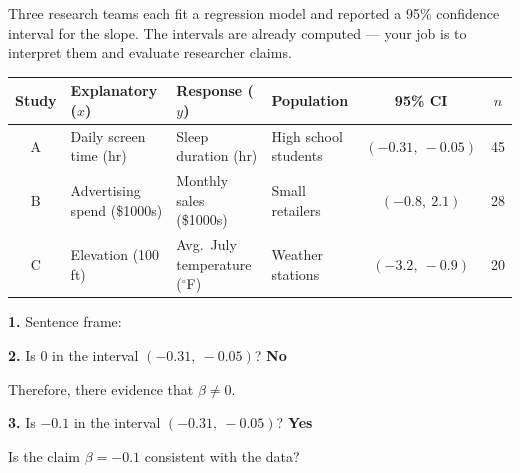 \documentclass[10pt]{article}
\begin{document}
\namepartnerperiod

\vspace{0.1in}
Three research teams each fit a regression model and reported a 95\% confidence interval
for the slope. The intervals are already computed --- your job is to interpret them and
evaluate researcher claims.

\vspace{0.08in}
\begin{center}
\renewcommand{\arraystretch}{1.4}
\begin{tabular}{clllcc}
    \textbf{Study} & \textbf{Explanatory ($x$)} & \textbf{Response ($y$)} &
    \textbf{Population} & \textbf{95\% CI} & \textbf{$n$} \\
    \hline
    A & Daily screen time (hr) & Sleep duration (hr) & High school students & $(-0.31,\ -0.05)$ & 45 \\
    B & Advertising spend (\$1000s) & Monthly sales (\$1000s) & Small retailers & $(-0.8,\ 2.1)$ & 28 \\
    C & Elevation (100 ft) & Avg.\ July temperature ($^\circ$F) & Weather stations & $(-3.2,\ -0.9)$ & 20 \\
\end{tabular}
\end{center}

\vspace{0.1in}

\begin{tcolorbox}[colback=white, colframe=black!40,
    title=\textbf{Tier R --- Remediate (Key)},
    fonttitle=\bfseries, arc=2mm, left=3mm, right=3mm, top=2mm, bottom=2mm]

\textbf{1.} Sentence frame:


\vspace{0.1in}
\textbf{2.} Is 0 in the interval $(-0.31,\ -0.05)$? \quad \textcolor{keyred}{\textbf{No}}

Therefore, there  evidence that $\beta \ne 0$.

\vspace{0.1in}
\textbf{3.} Is $-0.1$ in the interval $(-0.31,\ -0.05)$? \quad \textcolor{keyred}{\textbf{Yes}}

Is the claim $\beta = -0.1$ consistent with the data?

\end{tcolorbox}
\end{document}

